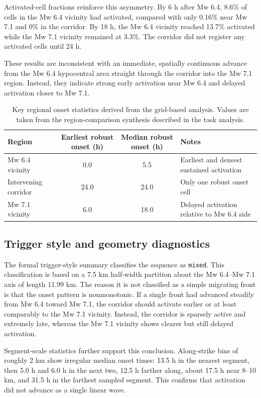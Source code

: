 \documentclass[11pt]{article}
\begin{document}
Activated-cell fractions reinforce this asymmetry. By 6 h after Mw 6.4, 8.6\% of cells in the Mw 6.4 vicinity had activated, compared with only 0.16\% near Mw 7.1 and 0\% in the corridor. By 18 h, the Mw 6.4 vicinity reached 13.7\% activated while the Mw 7.1 vicinity remained at 3.3\%. The corridor did not register any activated cells until 24 h.

These results are inconsistent with an immediate, spatially continuous advance from the Mw 6.4 hypocentral area straight through the corridor into the Mw 7.1 region. Instead, they indicate strong early activation near Mw 6.4 and delayed activation closer to Mw 7.1.

\begin{table}[H]
\centering
\caption{Key regional onset statistics derived from the grid-based analysis. Values are taken from the region-comparison synthesis described in the task analysis.}
\label{tab:regional}
\begin{tabularx}{0.92\textwidth}{>{\raggedright\arraybackslash}p{}cc>{\raggedright\arraybackslash}X}
\toprule
Region & Earliest robust onset (h) & Median robust onset (h) & Notes \\
\midrule
Mw 6.4 vicinity & 0.0 & 5.5 & Earliest and densest sustained activation \\
Intervening corridor & 24.0 & 24.0 & Only one robust onset cell \\
Mw 7.1 vicinity & 6.0 & 18.0 & Delayed activation relative to Mw 6.4 side \\
\bottomrule
\end{tabularx}
\end{table}

\subsection{Trigger style and geometry diagnostics}
The formal trigger-style summary classifies the sequence as \texttt{mixed}. This classification is based on a 7.5 km half-width partition about the Mw 6.4--Mw 7.1 axis of length 11.99 km. The reason it is not classified as a simple migrating front is that the onset pattern is nonmonotonic. If a single front had advanced steadily from Mw 6.4 toward Mw 7.1, the corridor should activate earlier or at least comparably to the Mw 7.1 vicinity. Instead, the corridor is sparsely active and extremely late, whereas the Mw 7.1 vicinity shows clearer but still delayed activation.

Segment-scale statistics further support this conclusion. Along-strike bins of roughly 2 km show irregular median onset times: 13.5 h in the nearest segment, then 5.0 h and 6.0 h in the next two, 12.5 h farther along, about 17.5 h near 8--10 km, and 31.5 h in the farthest sampled segment. This confirms that activation did not advance as a single linear wave.
\end{document}

